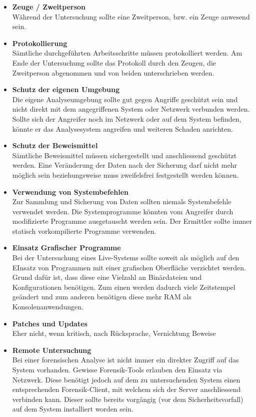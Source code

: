 \begin{itemize}
\item \textbf{Zeuge / Zweitperson} \\
Während der Untersuchung sollte eine Zweitperson, bzw. ein Zeuge anwesend sein.
\item \textbf{Protokollierung} \\
Sämtliche durchgeführten Arbeitsschritte müssen protokolliert werden. Am Ende der Untersuchung sollte das Protokoll durch den Zeugen, die Zweitperson abgenommen und von beiden unterschrieben werden.
\item \textbf{Schutz der eigenen Umgebung} \\
Die eigene Analyseumgebung sollte gut gegen Angriffe geschützt sein und nicht direkt mit dem angegriffenen System oder Netzwerk verbunden werden. Sollte sich der Angreifer noch im Netzwerk oder auf dem System befinden, könnte er das Analysesystem angreifen und weiteren Schaden anrichten.
\item \textbf{Schutz der Beweismittel} \\
Sämtliche Beweismittel müssen sichergestellt und anschliessend geschützt werden. Eine Veränderung der Daten nach der Sicherung darf nicht mehr möglich sein beziehungsweise muss zweifelsfrei festgestellt werden können.
\item \textbf{Verwendung von Systembefehlen} \\
Zur Sammlung und Sicherung von Daten sollten niemals Systembefehle verwendet werden. Die Systemprogramme könnten vom Angreifer durch modifizierte Programme ausgetauscht werden sein. Der Ermittler sollte immer statisch vorkompilierte Programme verwenden.
\item \textbf{Einsatz Grafischer Programme} \\
Bei der Untersuchung eines Live-Systems sollte soweit als möglich auf den EInsatz von Programmen mit einer grafischen Oberfläche verzichtet werden. Grund dafür ist, dass diese eine Vielzahl an Binärdateien und Konfigurationen benötigen. Zum einen werden dadurch viele Zeitstempel geändert und zum anderen benötigen diese mehr RAM als Konsolenanwendungen.
\item \textbf{Patches und Updates} \\
Eher nicht, wenn kritisch, nach Rücksprache, Vernichtung Beweise
\item \textbf{Remote Untersuchung} \\
Bei einer forensischen Analyse ist nicht immer ein direkter Zugriff auf das System vorhanden. Gewisse Forensik-Tools erlauben den Einsatz via Netzwerk. Diese benötigt jedoch auf dem zu untersuchenden System einen entsprechenden Forensik-Client, mit welchem sich der Server anschliessend verbinden kann. Dieser sollte bereits vorgängig (vor dem Sicherheitsvorfall) auf dem System installiert worden sein.
\end{itemize}
